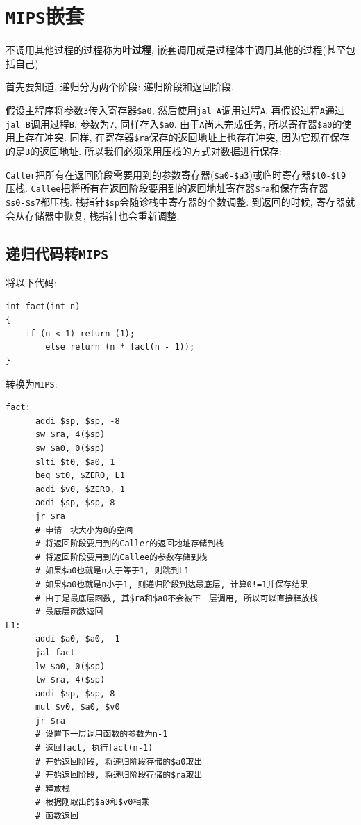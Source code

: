 \section{\texttt{MIPS}嵌套}
不调用其他过程的过程称为\textbf{叶过程}, 嵌套调用就是过程体中调用其他的过程(甚至包括自己) \par
首先要知道, 递归分为两个阶段: 递归阶段和返回阶段. \par
假设主程序将参数\verb|3|传入寄存器\verb|$a0|, 然后使用\verb|jal A|调用过程\verb|A|. 再假设过程\verb|A|通过\verb|jal B|调用过程\verb|B|, 参数为\verb|7|, 同样存入\verb|$a0|. 由于\verb|A|尚未完成任务, 所以寄存器\verb|$a0|的使用上存在冲突. 同样, 在寄存器\verb|$ra|保存的返回地址上也存在冲突, 因为它现在保存的是\verb|B|的返回地址. 所以我们必须采用压栈的方式对数据进行保存: \par
\texttt{Caller}把所有在返回阶段需要用到的参数寄存器(\verb|$a0-$a3|)或临时寄存器\verb|$t0-$t9|压栈. \verb|Callee|把将所有在返回阶段要用到的返回地址寄存器\verb|$ra|和保存寄存器\verb|$s0-$s7|都压栈. 栈指针\verb|$sp|会随诊栈中寄存器的个数调整. 到返回的时候, 寄存器就会从存储器中恢复, 栈指针也会重新调整.
\subsection{递归代码转\texttt{MIPS}}
将以下代码:
\begin{lstlisting}
int fact(int n)
{
    if (n < 1) return (1);
        else return (n * fact(n - 1));
}
\end{lstlisting}\par
转换为\texttt{MIPS}:
\begin{lstlisting}
fact:
      addi $sp, $sp, -8
      sw $ra, 4($sp)
      sw $a0, 0($sp)
      slti $t0, $a0, 1
      beq $t0, $ZERO, L1
      addi $v0, $ZERO, 1
      addi $sp, $sp, 8
      jr $ra
      # 申请一块大小为8的空间
      # 将返回阶段要用到的Caller的返回地址存储到栈
      # 将返回阶段要用到的Callee的参数存储到栈
      # 如果$a0也就是n大于等于1, 则跳到L1
      # 如果$a0也就是n小于1, 则递归阶段到达最底层, 计算0!=1并保存结果
      # 由于是最底层函数, 其$ra和$a0不会被下一层调用, 所以可以直接释放栈
      # 最底层函数返回
L1:
      addi $a0, $a0, -1
      jal fact
      lw $a0, 0($sp)
      lw $ra, 4($sp)
      addi $sp, $sp, 8
      mul $v0, $a0, $v0
      jr $ra
      # 设置下一层调用函数的参数为n-1
      # 返回fact, 执行fact(n-1)
      # 开始返回阶段, 将递归阶段存储的$a0取出
      # 开始返回阶段, 将递归阶段存储的$ra取出
      # 释放栈
      # 根据刚取出的$a0和$v0相乘
      # 函数返回
\end{lstlisting}
